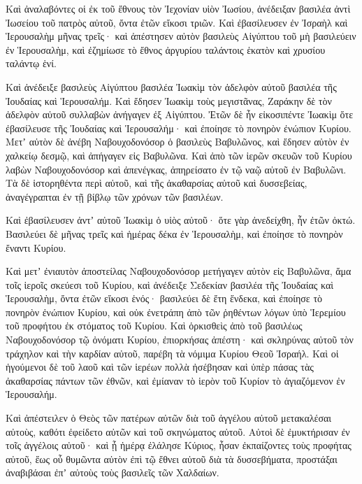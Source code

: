 {\par }{\PP {}Καὶ ἀναλαβόντες οἱ ἐκ τοῦ ἔθνους τὸν Ἰεχονίαν υἱὸν Ἰωσίου, ἀνέδειξαν βασιλέα ἀντὶ Ἰωσείου τοῦ πατρὸς αὐτοῦ, ὄντα ἐτῶν εἴκοσι τριῶν.
Καὶ ἐβασίλευσεν ἐν Ἰσραὴλ καὶ Ἱερουσαλὴμ μῆνας τρεῖς· καὶ ἀπέστησεν αὐτὸν βασιλεὺς Αἰγύπτου τοῦ μὴ βασιλεύειν ἐν Ἱερουσαλὴμ,
καὶ ἐζημίωσε τὸ ἔθνος ἀργυρίου ταλάντοις ἑκατὸν καὶ χρυσίου ταλάντῳ ἑνί.
\par }{\PP {}Καὶ ἀνέδειξε βασιλεὺς Αἰγύπτου βασιλέα Ἰωακὶμ τὸν ἀδελφὸν αὐτοῦ βασιλέα τῆς Ἰουδαίας καὶ Ἱερουσαλήμ.
Καὶ ἔδησεν Ἰωακὶμ τοὺς μεγιστᾶνας, Ζαράκην δὲ τὸν ἀδελφὸν αὐτοῦ συλλαβὼν ἀνήγαγεν ἐξ Αἰγύπτου.
Ἐτῶν δὲ ἦν εἰκοσιπέντε Ἰωακὶμ ὅτε ἐβασίλευσε τῆς Ἰουδαίας καὶ Ἱερουσαλήμ· καὶ ἐποίησε τὸ πονηρὸν ἐνώπιον Κυρίου.
Μετʼ αὐτὸν δὲ ἀνέβη Ναβουχοδονόσορ ὁ βασιλεὺς Βαβυλῶνος, καὶ ἔδησεν αὐτὸν ἐν χαλκείῳ δεσμῷ, καὶ ἀπήγαγεν εἰς Βαβυλῶνα.
Καὶ ἀπὸ τῶν ἱερῶν σκευῶν τοῦ Κυρίου λαβὼν Ναβουχοδονόσορ καὶ ἀπενέγκας, ἀπηρείσατο ἐν τῷ ναῷ αὐτοῦ ἐν Βαβυλῶνι.
Τὰ δὲ ἱστορηθέντα περὶ αὐτοῦ, καὶ τῆς ἀκαθαρσίας αὐτοῦ καὶ δυσσεβείας, ἀναγέγραπται ἐν τῇ βίβλῳ τῶν χρόνων τῶν βασιλέων.
\par }{\PP {}Καὶ ἐβασίλευσεν ἀντʼ αὐτοῦ Ἰωακὶμ ὁ υἱὸς αὐτοῦ· ὅτε γὰρ ἀνεδείχθη, ἦν ἐτῶν ὀκτώ.
Βασιλεύει δὲ μῆνας τρεῖς καὶ ἡμέρας δέκα ἐν Ἱερουσαλὴμ, καὶ ἐποίησε τὸ πονηρὸν ἔναντι Κυρίου.
\par }{\PP {}Καὶ μετʼ ἐνιαυτὸν ἀποστείλας Ναβουχοδονόσορ μετήγαγεν αὐτὸν εἰς Βαβυλῶνα, ἅμα τοῖς ἱεροῖς σκεύεσι τοῦ Κυρίου,
καὶ ἀνέδειξε Σεδεκίαν βασιλέα τῆς Ἰουδαίας καὶ Ἱερουσαλὴμ, ὄντα ἐτῶν εἴκοσι ἑνός· βασιλεύει δὲ ἔτη ἕνδεκα,
καὶ ἐποίησε τὸ πονηρὸν ἐνώπιον Κυρίου, καὶ οὐκ ἐνετράπη ἀπὸ τῶν ῥηθέντων λόγων ὑπὸ Ἱερεμίου τοῦ προφήτου ἐκ στόματος τοῦ Κυρίου.
Καὶ ὁρκισθεὶς ἀπὸ τοῦ βασιλέως Ναβουχοδονόσορ τῷ ὀνόματι Κυρίου, ἐπιορκήσας ἀπέστη· καὶ σκληρύνας αὐτοῦ τὸν τράχηλον καὶ τὴν καρδίαν αὐτοῦ, παρέβη τὰ νόμιμα Κυρίου Θεοῦ Ἰσραήλ.
Καὶ οἱ ἡγούμενοι δὲ τοῦ λαοῦ καὶ τῶν ἱερέων πολλὰ ἠσέβησαν καὶ ὑπὲρ πάσας τὰς ἀκαθαρσίας πάντων τῶν ἐθνῶν, καὶ ἐμίαναν τὸ ἱερὸν τοῦ Κυρίον τὸ ἁγιαζόμενον ἐν Ἱερουσαλήμ.
\par }{\PP {}Καὶ ἀπέστειλεν ὁ Θεὸς τῶν πατέρων αὐτῶν διὰ τοῦ ἀγγέλου αὐτοῦ μετακαλέσαι αὐτοὺς, καθότι ἐφείδετο αὐτῶν καὶ τοῦ σκηνώματος αὐτοῦ.
Αὐτοὶ δὲ ἐμυκτήρισαν ἐν τοῖς ἀγγέλοις αὐτοῦ·
καὶ ᾗ ἡμέρᾳ ἐλάλησε Κύριος, ἦσαν ἐκπαίζοντες τοὺς προφήτας αὐτοῦ, ἕως οὗ θυμῶντα αὐτὸν ἐπὶ τῷ ἔθνει αὐτοῦ διὰ τὰ δυσσεβήματα, προστάξαι ἀναβιβάσαι ἐπʼ αὐτοὺς τοὺς βασιλεῖς τῶν Χαλδαίων.
}
